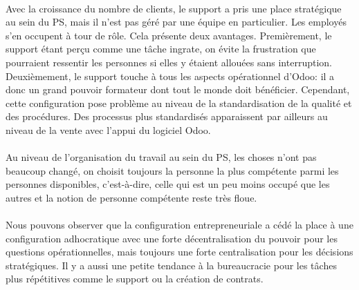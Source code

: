 \paragraph{} Avec la croissance du nombre de clients, le support a pris une place stratégique au sein du PS, mais il n'est pas géré par une équipe en particulier. Les employés s'en occupent à tour de rôle. Cela présente deux avantages. Premièrement, le support étant perçu comme une tâche ingrate, on évite la frustration que pourraient ressentir les personnes si elles y étaient allouées sans interruption. Deuxièmement, le support touche à tous les aspects opérationnel d'Odoo: il a donc un grand pouvoir formateur dont tout le monde doit bénéficier. Cependant, cette configuration pose problème au niveau de la standardisation de la qualité et des procédures. Des processus plus standardisés apparaissent par ailleurs au niveau de la vente avec l'appui du logiciel Odoo. 

\paragraph{} Au niveau de l'organisation du travail au sein du PS, les choses n'ont pas beaucoup changé, on choisit toujours la personne la plus compétente parmi les personnes disponibles, c'est-à-dire, celle qui est un peu moins occupé que les autres et la notion de personne compétente reste très floue. 

\paragraph{} Nous pouvons observer que la configuration entrepreneuriale a cédé la place à une configuration adhocratique\citep[pp. 53-54]{pichault} avec une forte décentralisation du pouvoir pour les questions opérationnelles, mais toujours une forte centralisation pour les décisions stratégiques. Il y a aussi une petite tendance à la bureaucracie pour les tâches plus répétitives comme le support ou la création de contrats. 

